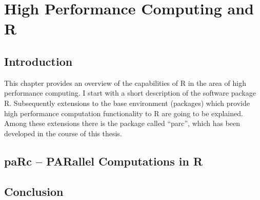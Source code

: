 \chapter{High Performance Computing and R}
\label{chap:Rhpc}
\section{Introduction}

This chapter provides an overview of the capabilities of R in the area
of high performance computing. I start with a short description of the
software package R. Subsequently extensions to the base environment
(packages) which provide high performance computation functionality to
R are going to be explained. Among these extensions there is the
package called ``parc'', which has been developed in the course of
this thesis.







\section{paRc -- PARallel Computations in R}

\section{Conclusion}

